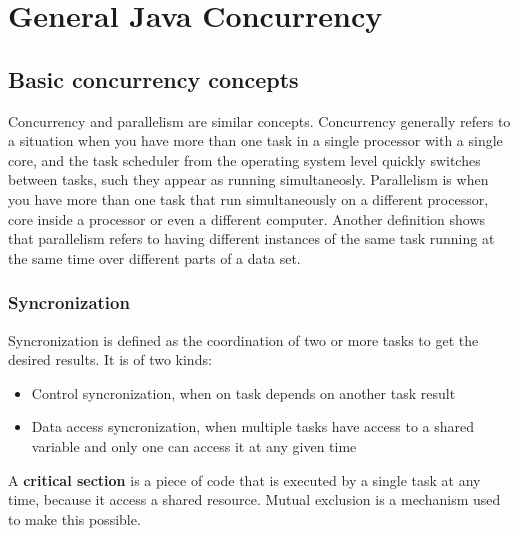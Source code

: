 
\chapter{General Java Concurrency} %

\label{Chapter1} %


\section{Basic concurrency concepts}
Concurrency and parallelism are similar concepts. Concurrency generally refers to a situation when you have more than one task in a single processor with a single core, and the task scheduler from the operating system level quickly switches between tasks, such they appear as running simultaneosly. Parallelism is when you have more than one task that run simultaneously on a different processor, core inside a processor or even a different computer. Another definition shows that parallelism refers to having different instances of the same task running at the same time over different parts of a data set. \cite{FernandezGonzalez}

\subsection{Syncronization}
Syncronization is defined as the coordination of two or more tasks to get the desired results. It is of two kinds:
\begin{itemize}
\item Control syncronization, when on task depends on another task result
\item Data access syncronization, when multiple tasks have access to a shared variable and only one can access it at any given time
\end{itemize}   

A \textbf{critical section} is a piece of code that is executed by a single task at any time, because it access a shared resource. Mutual exclusion is a mechanism used to make this possible.


